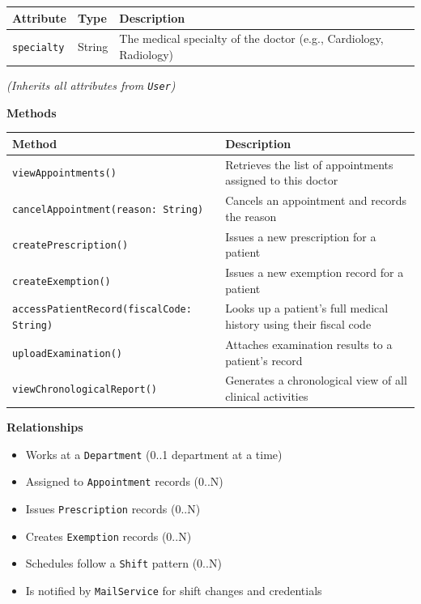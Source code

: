 \documentclass[12pt, a4paper]{article}
\begin{document}
\begin{center}
\small
\renewcommand{\arraystretch}{1.35}
\begin{tabularx}{\textwidth}{|>{\raggedright\arraybackslash}p{3.4cm}|>{\raggedright\arraybackslash}p{3.3cm}|Y|}
\hline
{}
\textbf{Attribute} & \textbf{Type} & \textbf{Description} \\ \hline
\texttt{specialty} & String & The medical specialty of the doctor (e.g., Cardiology, Radiology) \\ \hline
\end{tabularx}
\end{center}

\emph{(Inherits all attributes from \texttt{User})}

\textbf{Methods}

\begin{center}
\small
\renewcommand{\arraystretch}{1.35}
\begin{tabularx}{\textwidth}{|M|Y|}
\hline
{}
\textbf{Method} & \textbf{Description} \\ \hline
\texttt{viewAppointments()} & Retrieves the list of appointments assigned to this doctor \\ \hline
\texttt{cancelAppointment(reason: String)} & Cancels an appointment and records the reason \\ \hline
\texttt{createPrescription()} & Issues a new prescription for a patient \\ \hline
\texttt{createExemption()} & Issues a new exemption record for a patient \\ \hline
\texttt{accessPatientRecord(fiscalCode: String)} & Looks up a patient's full medical history using their fiscal code \\ \hline
\texttt{uploadExamination()} & Attaches examination results to a patient's record \\ \hline
\texttt{viewChronologicalReport()} & Generates a chronological view of all clinical activities \\ \hline
\end{tabularx}
\end{center}

\textbf{Relationships}

\begin{itemize}
    \item Works at a \texttt{Department} (0..1 department at a time)
    \item Assigned to \texttt{Appointment} records (0..N)
    \item Issues \texttt{Prescription} records (0..N)
    \item Creates \texttt{Exemption} records (0..N)
    \item Schedules follow a \texttt{Shift} pattern (0..N)
    \item Is notified by \texttt{MailService} for shift changes and credentials
\end{itemize}
\end{document}
